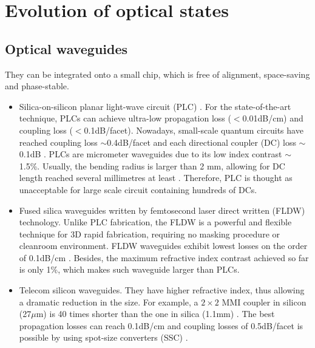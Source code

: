 %
%

\section{Evolution of optical states}  \label{sec:LO_evolution}

%
%

\subsection{Optical waveguides} 

They can be integrated onto a small chip, which is free of alignment, space-saving and phase-stable.

\begin{itemize}
    \item Silica-on-silicon planar light-wave circuit (PLC) \cite{bib:hibino2003silica}. For the state-of-the-art technique, PLCs can achieve ultra-low propagation loss ($<$0.01dB/cm) and coupling loss ($<$0.1dB/facet). Nowadays, small-scale quantum circuits have reached coupling loss $\sim$0.4dB/facet and each directional coupler (DC) loss $\sim$0.1dB \cite{bib:carolan2015universal}. PLCs are micrometer waveguides due to its low index contrast $\sim$1.5\%. Usually, the bending radius is larger than 2 mm, allowing for DC length reached several millimetres at least \cite{bib:carolan2015universal}. Therefore, PLC is thought as unacceptable for large scale circuit containing hundreds of DCs.

    \item Fused silica waveguides written by femtosecond laser direct written (FLDW) technology. Unlike PLC fabrication, the FLDW is a powerful and flexible technique for 3D rapid fabrication, requiring no masking procedure or cleanroom environment. FLDW waveguides exhibit lowest losses on the order of 0.1dB/cm \cite{bib:sakuma2003ultra}. Besides, the maximum refractive index contrast achieved so far is only 1\%, which makes such waveguide larger than PLCs.

    \item Telecom silicon waveguides. They have higher refractive index, thus allowing a dramatic reduction in the size. For example, a \mbox{$2\times 2$} MMI coupler in silicon (27$\mu$m) \cite{bib:bonneau2012quantum} is 40 times shorter than the one in silica (1.1mm) \cite{bib:peruzzo2011}. The best propagation losses can reach 0.1dB/cm \cite{bib:lee2000, bib:gnan2008} and coupling losses of 0.5dB/facet is possible by using spot-size converters (SSC) \cite{bib:almeida2003, bib:mcnab2003}.
\end{itemize}

